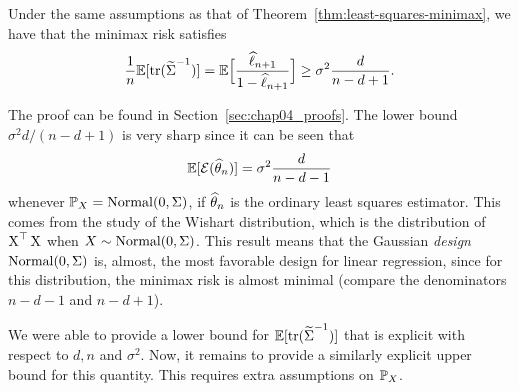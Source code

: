 \begin{corollary}
	\label{cor:proof-lower-bound-leverage}
	Under the same assumptions as that of Theorem~\ref{thm:least-squares-minimax}, we have that the minimax risk satisfies
	\begin{equation*}
		\frac 1n \E [ \tr ( \wt \bSigma^{-1}) ] = \E \Big[ \frac{\wh \ell_{n+1}}{1 - \wh \ell_{n+1}} \Big] \geq \sigma^2 \frac{d}{n - d + 1}.
	\end{equation*}
\end{corollary}
The proof can be found in Section~\ref{sec:chap04_proofs}.
The lower bound $\sigma^2 d / (n - d + 1)$ is very sharp since it can be seen that
\begin{equation*}
	\E [\cE(\wh \theta_n)] = \sigma^2 \frac{d}{n - d - 1}
\end{equation*}
whenever $\P_X = \nor(0, \bSigma)$, if $\wh \theta_n$ is the ordinary least squares estimator.
This comes from the study of the Wishart distribution, which is the distribution of $\bX^\top \bX$ when $X \sim \nor(0, \bSigma)$.%
This result means that the Gaussian \emph{design} $\nor(0, \bSigma)$ is, almost, the most favorable design for linear regression, since for this distribution, the minimax risk is almost minimal (compare the denominators $n - d - 1$ and $n - d + 1$).%

We were able to provide a lower bound for $\E[ \tr (\wt \bSigma^{-1})]$ that is explicit with respect to $d, n$ and $\sigma^2$.
Now, it remains to provide a similarly explicit upper bound for this quantity.
This requires extra assumptions on $\P_X$.

